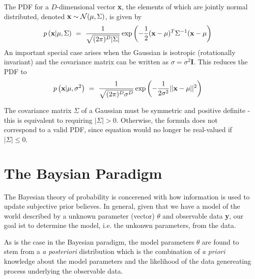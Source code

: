 \documentclass[11pt]{article}
\theoremstyle{plain}
\theoremstyle{definition}
\begin{document}
The PDF for a $D$-dimensional vector \textbf{x}, the elements of which are jointly normal distributed, denoted $\textbf{x} \sim \mathcal{N}(\boldmath{\mu}, \Sigma)$, is given by
\begin{equation}
p\left(\textbf{x}|\boldmath{\mu},\Sigma\right) \ = \ \frac{1}{\sqrt{(2\pi)^D|\Sigma|}} \exp{\left(-\frac{1}{2}(\textbf{x}-\boldmath{\mu})^T\Sigma^{-1}(\textbf{x}-\boldmath{\mu}\right)}
\end{equation}
An important special case arises when the Gaussian is isotropic (rotationally invariant) and the covariance matrix can be written as $\sigma = \sigma^2\textbf{I}$. This reduces the PDF to
\begin{equation}
p\left( \textbf{x} | \boldmath{\mu} , \sigma^2 \right) \ = \ \frac{1}{\sqrt{(2\pi)^D\sigma^D}} \exp{\left(-\frac{1}{2\sigma^2}||\textbf{x}-\boldmath{\mu}||^2\right)}
\end{equation}

The covariance matrix $\Sigma$ of a Gaussian must be symmetric and positive definite - this is equivalent to requiring $|\Sigma| > 0$. Otherwise, the formula does not correspond to a valid PDF, since equation would no longer be real-valued if $|\Sigma| \leq 0$.

\section{The Baysian Paradigm}
The Bayesian theory of probability is concerened with how information is used to update subjective prior believes. In general, given that we have a model of the world described by a unknown parameter (vector) $\theta$ and observable data \textbf{y}, our goal ist to determine the model, i.e. the unkonwn parameters, from the data.

As is the case in the Bayesian paradigm, the model parameters $\theta$ are found to stem from a \textit{a posteriori} distribution which is the combination of \textit{a priori} knowledge about the model parameters and the likelihood of the data genereating process underlying the observable data.
\end{document}
